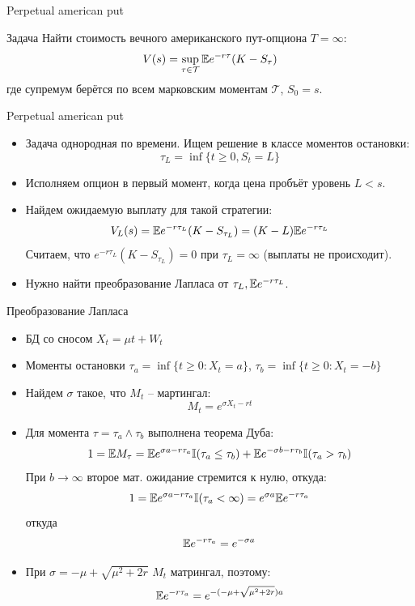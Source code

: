 \documentclass[aspectratio=169]{beamer}
\begin{document}
\begin{frame}{Perpetual american put}
    \begin{block}{Задача}
        Найти стоимость вечного американского пут-опциона $T=\infty$:
        $$
            V(s) = \sup_{\tau \in \mathcal{T}} \mathbb{E} e^{-r\tau} (K-S_{\tau})
        $$где супремум берётся по всем марковским моментам $\mathcal{T}$, $S_0 = s$.
    \end{block}
\end{frame}

\begin{frame}{Perpetual american put}
    \begin{itemize}
        \item Задача однородная по времени. Ищем решение в классе моментов остановки:
        $$
            \tau_L = \inf\{t \geq 0, S_t = L\}
        $$
        \item Исполняем опцион в первый момент, когда цена пробъёт уровень $L < s$.
        \item Найдем ожидаемую выплату для такой стратегии:
        $$
            V_L(s) = \mathbb{E} e^{-r\tau_L}(K-S_{\tau_L})
            = (K-L)\mathbb{E} e^{-r\tau_L}
        $$Считаем, что $e^{-r\tau_L}(K-S_{\tau_L})=0$ при $\tau_L = \infty$ (выплаты не происходит).
        \item Нужно найти преобразование Лапласа от $\tau_L, \mathbb{E} e^{-r\tau_L}$.
    \end{itemize}
\end{frame}

\begin{frame}{Преобразование Лапласа}
    \begin{itemize}
        \item БД со сносом $X_t = \mu t + W_t$
        \item Моменты остановки 
        $\tau_a = \inf\{t \geq 0: X_t = a\}$,
        $\tau_b = \inf\{t \geq 0: X_t = -b\}$
        \item Найдем $\sigma$ такое, что $M_t$ -- мартингал:
        $$
            M_t = e^{\sigma X_t - r t}
        $$
        \item Для момента $\tau = \tau_a \land \tau_b$ выполнена теорема Дуба:
        $$
            1 = \mathbb{E} M_{\tau} = 
            \mathbb{E} e^{\sigma a - r \tau_a} \mathbb{I}(\tau_a \leq \tau_b)
            + \mathbb{E} e^{-\sigma b - r \tau_b} \mathbb{I}(\tau_a > \tau_b) 
        $$При $b\to \infty$ второе мат. ожидание стремится к нулю, откуда:
        $$
            1 = \mathbb{E} e^{\sigma a - r \tau_a} \mathbb{I}(\tau_a < \infty)
            = e^{\sigma a} \mathbb{E} e^{- r \tau_a}
        $$откуда
        $$
            \mathbb{E} e^{-r\tau_a} = e^{-\sigma a}
        $$
        \item При $\sigma = -\mu + \sqrt{\mu^2 + 2r}$ $M_t$ матрингал, поэтому:
        $$
        \mathbb{E} e^{-r\tau_a} = e^{-(-\mu + \sqrt{\mu^2 + 2r}) a}
        $$
    \end{itemize}
\end{frame}
\end{document}
